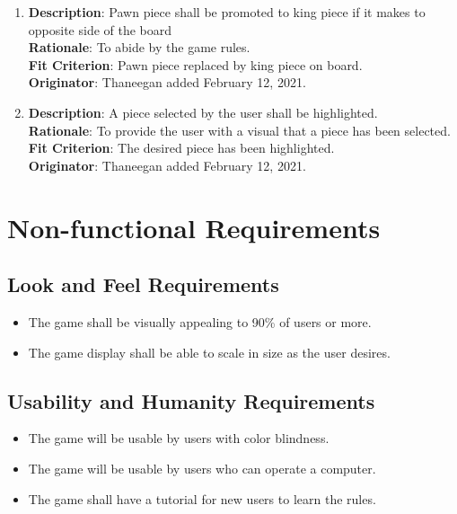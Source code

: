 \documentclass[12pt, titlepage]{article}
\begin{document}
\begin{enumerate}[{FR}1.]
    \item\textbf{Description}: Pawn piece shall be promoted to king piece if it makes to opposite side of the board\\
        \textbf{Rationale}: To abide by the game rules.\\
        \textbf{Fit Criterion}: Pawn piece replaced by king piece on board. \\
        \textbf{Originator}: Thaneegan added February 12, 2021.
        
    \item\textbf{Description}: A piece selected by the user shall be highlighted.\\
        \textbf{Rationale}: To provide the user with a visual that a piece has been selected.\\
        \textbf{Fit Criterion}: The desired piece has been highlighted. \\
        \textbf{Originator}: Thaneegan added February 12, 2021.
        
\end{enumerate}

\section{Non-functional Requirements}

\subsection{Look and Feel Requirements}
\begin{itemize}
    \item The game shall be visually appealing to 90\% of users or more.
    \item The game display shall be able to scale in size as the user desires.
\end{itemize}

\subsection{Usability and Humanity Requirements}
\begin{itemize}
    \item The game will be usable by users with color blindness.
    \item The game will be usable by users who can operate a computer.
    \item The game shall have a tutorial for new users to learn the rules.
\end{itemize}
\end{document}
